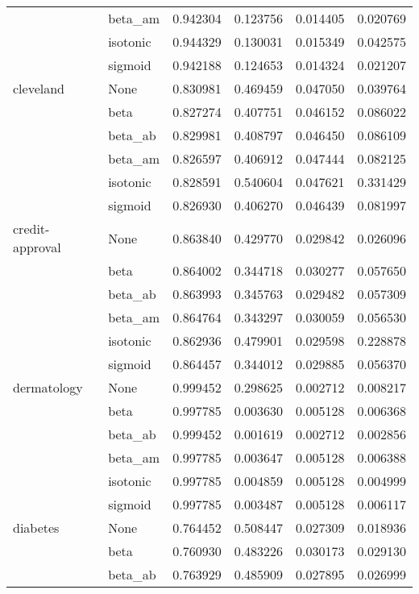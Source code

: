 \begin{tabular}{llrrrr}
        & beta\_am &  0.942304 &  0.123756 &  0.014405 &  0.020769 \\
        & isotonic &  0.944329 &  0.130031 &  0.015349 &  0.042575 \\
        & sigmoid &  0.942188 &  0.124653 &  0.014324 &  0.021207 \\
cleveland & None &  0.830981 &  0.469459 &  0.047050 &  0.039764 \\
        & beta &  0.827274 &  0.407751 &  0.046152 &  0.086022 \\
        & beta\_ab &  0.829981 &  0.408797 &  0.046450 &  0.086109 \\
        & beta\_am &  0.826597 &  0.406912 &  0.047444 &  0.082125 \\
        & isotonic &  0.828591 &  0.540604 &  0.047621 &  0.331429 \\
        & sigmoid &  0.826930 &  0.406270 &  0.046439 &  0.081997 \\
credit-approval & None &  0.863840 &  0.429770 &  0.029842 &  0.026096 \\
        & beta &  0.864002 &  0.344718 &  0.030277 &  0.057650 \\
        & beta\_ab &  0.863993 &  0.345763 &  0.029482 &  0.057309 \\
        & beta\_am &  0.864764 &  0.343297 &  0.030059 &  0.056530 \\
        & isotonic &  0.862936 &  0.479901 &  0.029598 &  0.228878 \\
        & sigmoid &  0.864457 &  0.344012 &  0.029885 &  0.056370 \\
dermatology & None &  0.999452 &  0.298625 &  0.002712 &  0.008217 \\
        & beta &  0.997785 &  0.003630 &  0.005128 &  0.006368 \\
        & beta\_ab &  0.999452 &  0.001619 &  0.002712 &  0.002856 \\
        & beta\_am &  0.997785 &  0.003647 &  0.005128 &  0.006388 \\
        & isotonic &  0.997785 &  0.004859 &  0.005128 &  0.004999 \\
        & sigmoid &  0.997785 &  0.003487 &  0.005128 &  0.006117 \\
diabetes & None &  0.764452 &  0.508447 &  0.027309 &  0.018936 \\
        & beta &  0.760930 &  0.483226 &  0.030173 &  0.029130 \\
        & beta\_ab &  0.763929 &  0.485909 &  0.027895 &  0.026999 \\

\end{tabular}
